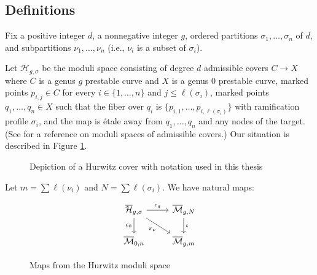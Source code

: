 \documentclass[11pt]{article}           %
\newcommand{\Hb}{\overline{\mathcal H}}
\theoremstyle{definition}
\begin{document}
\subsection{Definitions}
Fix a positive integer $d$, a nonnegative integer $g$, ordered partitions $\sigma_1,\dots,\sigma_n$ of $d$, and subpartitions $\nu_1,\dots,\nu_n$ (i.e., $\nu_i$ is a subset of $\sigma_i$).

Let $\Hb_{g,\sigma}$ be the moduli space consisting of degree $d$ admissible covers $C\to X$ where $C$ is a genus $g$ prestable curve and $X$ is a genus $0$ prestable curve, marked points $p_{i,j}\in C$ for every $i\in\{1,\dots,n\}$ and
$j\leq \ell(\sigma_i)$, 
marked points $q_1,\dots,q_n\in X$ such that
the fiber over $q_i$ is $\{p_{i,1},\dots,p_{i,\ell(\sigma_i)}\}$ with
ramification profile $\sigma_i$, and the map is \'etale away from $q_1,\dots,q_n$ and any nodes of the target. (See \cite{Admissible} for a reference on moduli spaces of admissible covers.) Our situation is described in Figure \ref{fig:hurwitz}.

\begin{figure}[h]
  \caption{Depiction of a Hurwitz cover with notation used in this thesis}
  \centering
{}

\label{fig:hurwitz}
\end{figure}



Let $m=\sum\ell(\nu_i)$ and $N=\sum\ell(\sigma_i)$.
We have natural maps:
~\\
\begin{figure}[h]
  \caption{Maps from the Hurwitz moduli space}
  \centering
  \[\begin{tikzcd}
	{\overline{\mathcal H}_{g,\sigma}} & {\overline{\mathcal M}_{g,N}} \\
	{\overline{\mathcal M}_{0,n}} & {\overline{\mathcal M}_{g,m}}
	\arrow["{\epsilon_g}", from=1-1, to=1-2]
	\arrow["{\epsilon_0}"', from=1-1, to=2-1]
	\arrow["{\pi_{\nu}}"', from=1-1, to=2-2]
	\arrow["\iota", from=1-2, to=2-2]
\end{tikzcd}\]
\label{fig:maps}
\end{figure}
\end{document}
